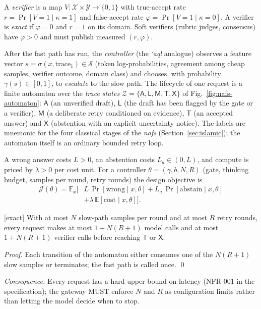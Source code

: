 \begin{definition}[Verifier]
A \emph{verifier} is a map $V:\mathcal X\times\mathcal Y\to\{0,1\}$ with
true-accept rate $r=\Pr[V=1\mid\kappa=1]$ and false-accept rate
$\varphi=\Pr[V=1\mid\kappa=0]$. A verifier is \emph{exact} if $\varphi=0$ and
$r=1$ on its domain. Soft verifiers (rubric judges, consensus) have
$\varphi>0$ and must publish measured $(r,\varphi)$.
\end{definition}

\begin{definition}
After the fast path has run, the \emph{controller} (the \emph{\textquoteleft aql}
analogue) observes a feature vector $s=\sigma(x,\text{trace}_1)\in\mathcal S$
(token log-probabilities, agreement among cheap samples, verifier outcome,
domain class) and chooses, with probability $\gamma(s)\in[0,1]$, to
\emph{escalate} to the slow path. The lifecycle of one request is a finite
automaton over the \emph{trace states}
$\mathcal Z=\{\mathsf{A},\mathsf{L},\mathsf{M},\mathsf{T},\mathsf{X}\}$ of
Fig.~\ref{fig:nafs-automaton}: $\mathsf A$ (an unverified draft),
$\mathsf L$ (the draft has been flagged by the gate or a verifier),
$\mathsf M$ (a deliberate retry conditioned on evidence), $\mathsf T$ (an
accepted answer) and $\mathsf X$ (abstention with an explicit uncertainty
notice). The labels are mnemonic for the four classical stages of the
\emph{nafs} (Section~\ref{sec:islamic}); the automaton itself is an ordinary
bounded retry loop.
\end{definition}

\begin{definition}
A wrong answer costs $L>0$, an abstention costs $L_a\in(0,L)$, and compute is
priced by $\lambda>0$ per cost unit. For a controller
$\theta=(\gamma,b,N,R)$ (gate, thinking budget, samples per round, retry
rounds) the design objective is
\begin{equation}
\label{eq:objective}
\begin{split}
\mathcal J(\theta)=\mathbb E_x\big[&L\,\Pr[\text{wrong}\mid x,\theta]
+L_a\,\Pr[\text{abstain}\mid x,\theta]\\
&+\lambda\,\mathbb E[\text{cost}\mid x,\theta]\big].
\end{split}
\end{equation}
\end{definition}

\begin{lemma}[Termination] \textnormal{[exact]}
\label{lem:termination}
With at most $N$ slow-path samples per round and at most $R$ retry rounds, every
request makes at most $1+N(R{+}1)$ model calls and at most $1+N(R{+}1)$
verifier calls before reaching $\mathsf T$ or $\mathsf X$.
\end{lemma}
\begin{proof}
Each transition of the automaton either consumes one of the $N(R{+}1)$ slow
samples or terminates; the fast path is called once. \qed
\end{proof}
\emph{Consequence.} Every request has a hard upper bound on latency
(NFR-001 in the specification); the gateway MUST enforce $N$ and $R$ as
configuration limits rather than letting the model decide when to stop.

